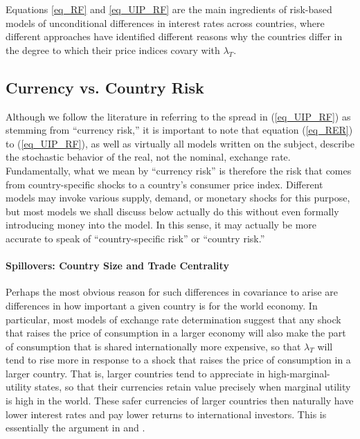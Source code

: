 \documentclass{ar-1col}
\begin{document}
Equations \eqref{eq_RF} and \eqref{eq_UIP_RF} are the main ingredients of risk-based models of unconditional differences in interest rates across countries, where different approaches have identified different reasons why the countries differ in the degree to which their price indices covary with $\lambda_T$.

\begin{textbox}[h]
\section{Currency vs. Country Risk}
Although we follow the literature in referring to the spread in (\ref{eq_UIP_RF}) as stemming from ``currency risk,'' it is important to note that equation (\ref{eq_RER}) to (\ref{eq_UIP_RF}), as well as virtually all models written on the subject, describe the stochastic behavior of the real, not the nominal, exchange rate. Fundamentally, what we mean by ``currency risk'' is therefore the risk that comes from country-specific shocks to a country's consumer price index. Different models may invoke various supply, demand, or monetary shocks for this purpose, but most models we shall discuss below actually do this without even formally introducing money into the model. In this sense, it may actually be more accurate to speak of ``country-specific risk'' or ``country risk.'' 
\end{textbox}


\paragraph*{Spillovers: Country Size and Trade Centrality}

Perhaps the most obvious reason for such differences in covariance to arise are differences in how important a given country is for the world economy. In particular, most models of exchange rate determination suggest that any shock that raises the price of consumption in a larger economy will also make the part of consumption that is shared internationally more expensive, so that $\lambda_T$ will tend to rise more in response to a shock that raises the price of consumption in a larger country. That is, larger countries tend to appreciate in high-marginal-utility states, so that their currencies retain value precisely when marginal utility is high in the world. These safer currencies of larger countries then naturally have lower interest rates and pay lower returns to international investors. This is essentially the argument in \citet{Martin2012} and \citet{Hassan2013}.
\end{document}
